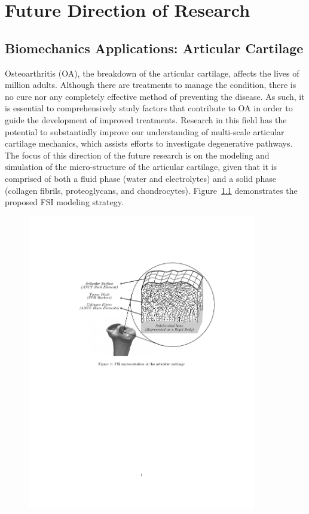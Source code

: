 \chapter{Future Direction of Research}
\label{chap:Future}
\section{Biomechanics Applications: Articular Cartilage}
Osteoarthritis (OA), the breakdown of the articular cartilage, affects the lives of million adults. Although there are treatments to manage the condition, there is no cure nor any completely effective method of preventing the disease. As such, it is essential to comprehensively study factors that contribute to OA in order to guide the development of improved treatments. Research in this field has the potential to substantially improve our understanding of multi-scale articular cartilage mechanics, which assists efforts to investigate degenerative pathways. The focus of this direction of the future research is  on the modeling and simulation of the micro-structure of the articular cartilage, given that it is comprised of both a fluid phase (water and electrolytes) and a solid phase (collagen fibrils, proteoglycans, and chondrocytes). Figure~\ref{fig:AC} demonstrates the proposed FSI modeling strategy. 
\begin{figure}
	\centering
	\includegraphics[width=10cm]{images/AC.pdf}
	\label{fig:AC}
\end{figure}
